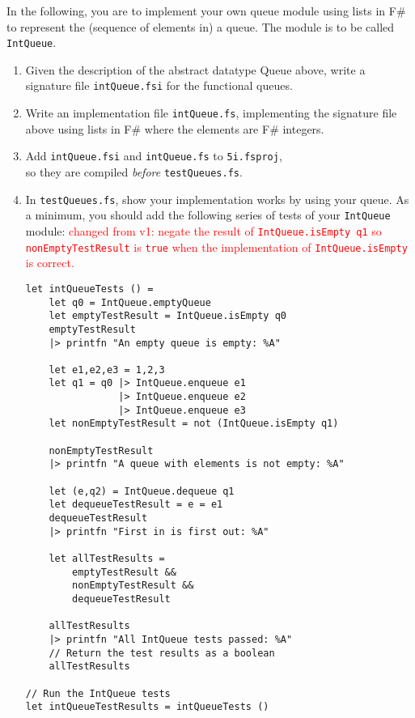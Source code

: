 In the following, you are to implement your own queue module using lists in F\# to represent the (sequence of elements in) a queue. The module is to be called \lstinline{IntQueue}.
\begin{enumerate}
\item Given the description of the abstract datatype Queue above, write a signature file \texttt{intQueue.fsi} for the functional queues. 
\item Write an implementation file \texttt{intQueue.fs}, implementing the signature file above using lists in F\# where the elements are F\# integers.
\item Add \texttt{intQueue.fsi} and \texttt{intQueue.fs} to \texttt{5i.fsproj},\\so they are compiled \textit{before} \texttt{testQueues.fs}.
\item In \texttt{testQueues.fs}, show your implementation works by using your queue. As a minimum, you should add the following series of tests of your \texttt{IntQueue} module:
\newline
{\textcolor{red}{changed from v1: negate the result of \texttt{IntQueue.isEmpty q1} so \texttt{nonEmptyTestResult} is \texttt{true} when the implementation of \texttt{IntQueue.isEmpty} is correct.}}
\begin{lstlisting}
let intQueueTests () =
    let q0 = IntQueue.emptyQueue
    let emptyTestResult = IntQueue.isEmpty q0
    emptyTestResult
    |> printfn "An empty queue is empty: %A"

    let e1,e2,e3 = 1,2,3
    let q1 = q0 |> IntQueue.enqueue e1
                |> IntQueue.enqueue e2
                |> IntQueue.enqueue e3
    let nonEmptyTestResult = not (IntQueue.isEmpty q1)

    nonEmptyTestResult
    |> printfn "A queue with elements is not empty: %A"

    let (e,q2) = IntQueue.dequeue q1
    let dequeueTestResult = e = e1
    dequeueTestResult
    |> printfn "First in is first out: %A" 

    let allTestResults =
        emptyTestResult &&
        nonEmptyTestResult &&
        dequeueTestResult

    allTestResults
    |> printfn "All IntQueue tests passed: %A"
    // Return the test results as a boolean
    allTestResults

// Run the IntQueue tests
let intQueueTestResults = intQueueTests ()

\end{lstlisting}
\end{enumerate}
